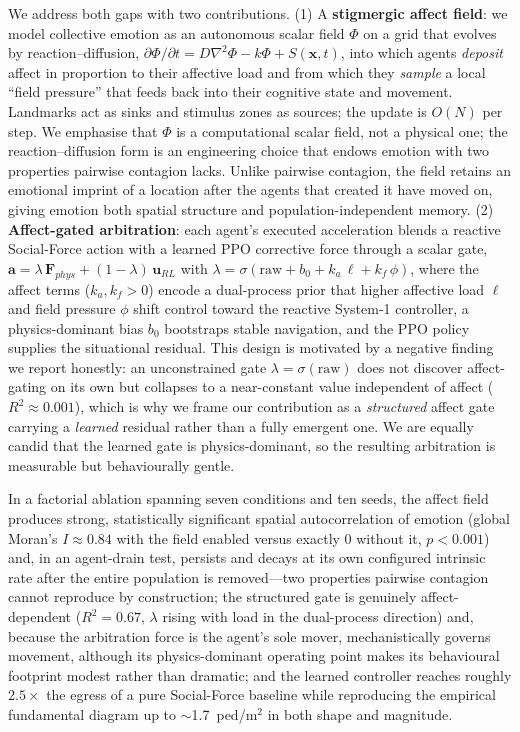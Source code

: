 \documentclass[sigconf,nonacm]{acmart}
\begin{document}
We address both gaps with two contributions. (1) A \textbf{stigmergic affect field}: we model collective emotion as an autonomous scalar field $\Phi$ on a grid that evolves by reaction--diffusion, $\partial\Phi/\partial t = D\nabla^2\Phi - k\Phi + S(\mathbf{x},t)$, into which agents \emph{deposit} affect in proportion to their affective load and from which they \emph{sample} a local ``field pressure'' that feeds back into their cognitive state and movement. Landmarks act as sinks and stimulus zones as sources; the update is $O(N)$ per step. We emphasise that $\Phi$ is a computational scalar field, not a physical one; the reaction--diffusion form is an engineering choice that endows emotion with two properties pairwise contagion lacks. Unlike pairwise contagion, the field retains an emotional imprint of a location after the agents that created it have moved on, giving emotion both spatial structure and population-independent memory. (2) \textbf{Affect-gated arbitration}: each agent's executed acceleration blends a reactive Social-Force action with a learned PPO corrective force through a scalar gate, $\mathbf{a} = \lambda\,\mathbf{F}_{phys} + (1-\lambda)\,\mathbf{u}_{RL}$ with $\lambda = \sigma(\mathrm{raw} + b_0 + k_a\,\ell + k_f\,\phi)$, where the affect terms ($k_a,k_f>0$) encode a dual-process prior that higher affective load $\ell$ and field pressure $\phi$ shift control toward the reactive System-1 controller, a physics-dominant bias $b_0$ bootstraps stable navigation, and the PPO policy supplies the situational residual. This design is motivated by a negative finding we report honestly: an unconstrained gate $\lambda=\sigma(\mathrm{raw})$ does not discover affect-gating on its own but collapses to a near-constant value independent of affect ($R^2\approx0.001$), which is why we frame our contribution as a \emph{structured} affect gate carrying a \emph{learned} residual rather than a fully emergent one. We are equally candid that the learned gate is physics-dominant, so the resulting arbitration is measurable but behaviourally gentle.

In a factorial ablation spanning seven conditions and ten seeds, the affect field produces strong, statistically significant spatial autocorrelation of emotion (global Moran's $I\approx0.84$ with the field enabled versus exactly $0$ without it, $p<0.001$) and, in an agent-drain test, persists and decays at its own configured intrinsic rate after the entire population is removed---two properties pairwise contagion cannot reproduce by construction; the structured gate is genuinely affect-dependent ($R^2=0.67$, $\lambda$ rising with load in the dual-process direction) and, because the arbitration force is the agent's sole mover, mechanistically governs movement, although its physics-dominant operating point makes its behavioural footprint modest rather than dramatic; and the learned controller reaches roughly $2.5\times$ the egress of a pure Social-Force baseline while reproducing the empirical fundamental diagram up to $\sim$1.7~ped/m$^2$ in both shape and magnitude.
\end{document}
